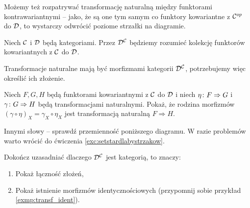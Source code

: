 \begin{remk}
  Możemy też rozpatrywać transformację naturalną między funktorami kontrawariantnymi -- jako, że są one tym samym co funktory kowariantne z ${\mathcal C}^{op}$ do $\mathcal D$, to wystarczy odwrócić poziome strzałki na diagramie.
\end{remk}

\begin{nott}
  Niech $\mathcal C$ i $\mathcal D$ będą kategoriami. Przez $\mathcal D^\mathcal C$ będziemy rozumieć kolekcję funktorów kowariantnych z $\mathcal C$ do $\mathcal D$.
\end{nott}

\begin{exc}
  Transformacje naturalne mają być morfizmami kategorii $\mathcal D^\mathcal C$, potrzebujemy więc określić ich złożenie.

  Niech $F, G, H$ będą funktorami kowariantnymi z $\mathcal C$ do $\mathcal D$ i niech $\eta\colon F\Rightarrow G$ i $\gamma\colon G\Rightarrow H$ będą transformacjami naturalnymi. Pokaż, że rodzina morfizmów $(\gamma\circ \eta)_X = \gamma_X\circ \eta_X$ jest transformacją naturalną $F\Rightarrow H$.
  \begin{center}
  \end{center}
  Innymi słowy -- sprawdź przemienność poniższego diagramu. W razie problemów warto wrócić do ćwiczenia \ref{exc:setstardlabystrzakow}.
  \begin{center}
  \end{center}
\end{exc}

\begin{exc}
  Dokończ uzasadniać dlaczego $\mathcal D^\mathcal C$ jest kategorią, to znaczy:
  \begin{enumerate}
    \item Pokaż łączność złożeń,
    \item Pokaż istnienie morfizmów identycznościowych (przypomnij sobie przykład \ref{exmp:transf_ident}).
  \end{enumerate}
\end{exc}

